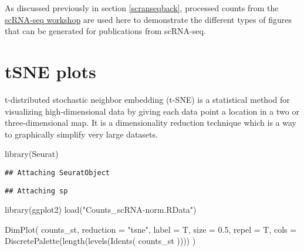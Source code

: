 \documentclass[
  openany]{book}
\newenvironment{Shaded}{\begin{snugshade}}{\end{snugshade}}
\newcommand{\AttributeTok}[1]{\textcolor[rgb]{0.77,0.63,0.00}{#1}}
\newcommand{\FloatTok}[1]{\textcolor[rgb]{0.00,0.00,0.81}{#1}}
\newcommand{\FunctionTok}[1]{\textcolor[rgb]{0.00,0.00,0.00}{#1}}
\newcommand{\NormalTok}[1]{#1}
\newcommand{\StringTok}[1]{\textcolor[rgb]{0.31,0.60,0.02}{#1}}
\begin{document}
As discussed previously in section \ref{scranseqback}, processed counts from the \href{https://chisangad.github.io/scRNAseqtut/index.html}{scRNA-seq workshop} are used here to demonstrate the different types of figures that can be generated for publications from scRNA-seq.

\hypertarget{tsne-plots}{%
\section{tSNE plots}\label{tsne-plots}}

t-distributed stochastic neighbor embedding (t-SNE) is a statistical method for visualizing high-dimensional data by giving each data point a location in a two or three-dimensional map. It is a dimensionality reduction technique which is a way to graphically simplify very large datasets.

\begin{Shaded}
\begin{Highlighting}[]
\FunctionTok{library}\NormalTok{(Seurat)}
\end{Highlighting}
\end{Shaded}

\begin{verbatim}
## Attaching SeuratObject
\end{verbatim}

\begin{verbatim}
## Attaching sp
\end{verbatim}

\begin{Shaded}
\begin{Highlighting}[]
\FunctionTok{library}\NormalTok{(ggplot2)}
\FunctionTok{load}\NormalTok{(}\StringTok{"Counts\_scRNA{-}norm.RData"}\NormalTok{)}
\end{Highlighting}
\end{Shaded}

\begin{Shaded}
\begin{Highlighting}[]
\FunctionTok{DimPlot}\NormalTok{(}
\NormalTok{  counts\_st,}
  \AttributeTok{reduction =} \StringTok{"tsne"}\NormalTok{,}
  \AttributeTok{label =}\NormalTok{ T,}
  \AttributeTok{size =} \FloatTok{0.5}\NormalTok{,}
  \AttributeTok{repel =}\NormalTok{ T,}
  \AttributeTok{cols =} \FunctionTok{DiscretePalette}\NormalTok{(}\FunctionTok{length}\NormalTok{(}\FunctionTok{levels}\NormalTok{(}\FunctionTok{Idents}\NormalTok{(}
\NormalTok{    counts\_st}
\NormalTok{  ))))}
\NormalTok{)}
\end{Highlighting}
\end{Shaded}
\end{document}
